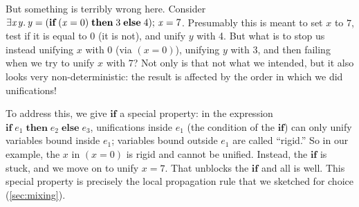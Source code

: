 \documentclass[acmsmall,review,dvipsnames]{acmart}
\newcommand{\Varid}[1]{\mathit{#1}}
\begin{document}
But something is terribly wrong here.  Consider \ensuremath{\exists\Varid{x}\hspace{0.3mm}\Varid{y}.\,\Varid{y}\mathrel{=}(\textbf{if}\;(\Varid{x}\mathrel{=}\mathrm{0})\;\textbf{then}\;\mathrm{3}\;\textbf{else}\;\mathrm{4});\,\Varid{x}\mathrel{=}\mathrm{7}}.  Presumably this is meant
to set \ensuremath{\Varid{x}} to \ensuremath{\mathrm{7}}, test if it is equal to \ensuremath{\mathrm{0}} (it is not), and unify \ensuremath{\Varid{y}} with 4.
But what is to stop us instead unifying \ensuremath{\Varid{x}} with \ensuremath{\mathrm{0}} (via \ensuremath{(\Varid{x}\mathrel{=}\mathrm{0})}), unifying \ensuremath{\Varid{y}} with \ensuremath{\mathrm{3}}, and then
failing when we try to unify \ensuremath{\Varid{x}} with \ensuremath{\mathrm{7}}?  Not only is that not what we intended, but it also looks very
non-deterministic: the result is affected by the order in which we did unifications!

To address this, we give \ensuremath{\textbf{if}} a special property: in the expression \ensuremath{\textbf{if}\;\Varid{e}_{\mathrm{1}}\;\textbf{then}\;\Varid{e}_{\mathrm{2}}\;\textbf{else}\;\Varid{e}_{\mathrm{3}}}, unifications inside \ensuremath{\Varid{e}_{\mathrm{1}}} (the condition of the \ensuremath{\textbf{if}})
can only unify variables bound inside \ensuremath{\Varid{e}_{\mathrm{1}}}; variables bound outside \ensuremath{\Varid{e}_{\mathrm{1}}} are called ``rigid.''  So in our example, the \ensuremath{\Varid{x}} in \ensuremath{(\Varid{x}\mathrel{=}\mathrm{0})} is
rigid and cannot be unified.  Instead, the \ensuremath{\textbf{if}} is stuck, and we move on to unify \ensuremath{\Varid{x}\mathrel{=}\mathrm{7}}.  That unblocks
the \ensuremath{\textbf{if}} and all is well.  This special property is precisely the local propagation rule that we sketched for
choice (\cref{sec:mixing}).
\end{document}
